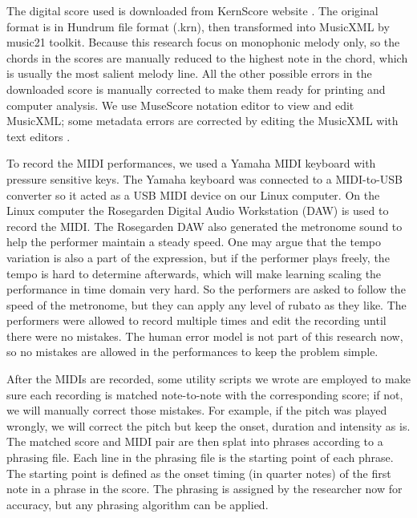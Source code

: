 The digital score used is downloaded from KernScore website \cite{KernScores}. The original format is in Hundrum file format (.krn), then transformed into MusicXML by music21 toolkit. Because this research focus on monophonic melody only, so the chords in the scores are manually reduced to the highest note in the chord, which is usually the most salient melody line. All the other possible errors in the downloaded score is manually corrected to make them ready for printing and computer analysis. We use MuseScore notation editor to view and edit MusicXML; some metadata errors are corrected by editing the MusicXML with text editors .

To record the MIDI performances, we used a Yamaha MIDI keyboard with pressure sensitive keys. The Yamaha keyboard was connected to a MIDI-to-USB  converter so it acted as a USB MIDI device on our Linux computer. On the Linux computer the Rosegarden Digital Audio Workstation (DAW) is used to record the MIDI. The Rosegarden DAW also generated the metronome sound to help the performer maintain a steady speed. One may argue that the tempo variation is also a part of the expression, but if the performer plays freely, the tempo is hard to determine afterwards, which will make learning scaling the performance in time domain very hard. So the performers are asked to follow the speed of the metronome, but they can apply any level of rubato as they like. The performers were allowed to record multiple times and edit the recording until there were no mistakes. The human error model is not part of this research now, so no mistakes are allowed in the performances to keep the problem simple.

  After the MIDIs are recorded, some utility scripts we wrote are employed to  make sure each recording is matched note-to-note with the corresponding score; if not, we will manually correct those mistakes. For example, if the pitch was played wrongly, we will correct the pitch but keep the onset, duration  and intensity as is. The matched score and MIDI pair are then splat into phrases according to a phrasing file.  Each line in the phrasing file is the starting point of each phrase. The starting point is defined as the onset timing (in quarter notes) of the first note in a phrase in the score.  The phrasing is assigned by the researcher now for accuracy, but any phrasing algorithm can be applied.


